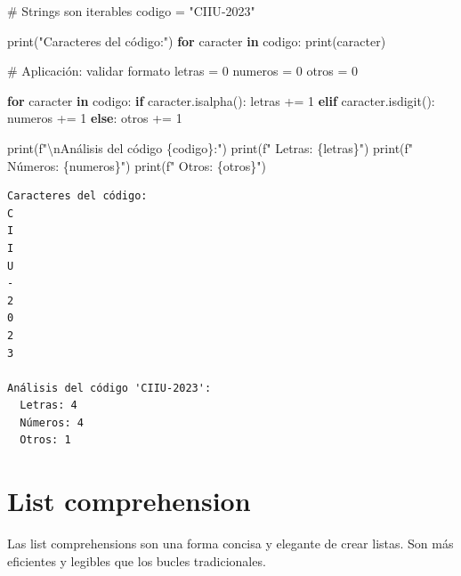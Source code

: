 \documentclass[
  doc,
  floatsintext,
  longtable,
  a4paper,
  nolmodern,
  notxfonts,
  notimes,
  12pt,
  colorlinks=true,linkcolor=blue,citecolor=blue,urlcolor=blue]{apa7}
\newenvironment{Shaded}{\begin{snugshade}}{\end{snugshade}}
\newcommand{\BuiltInTok}[1]{\textcolor[rgb]{0.00,0.23,0.31}{#1}}
\newcommand{\CharTok}[1]{\textcolor[rgb]{0.13,0.47,0.30}{#1}}
\newcommand{\CommentTok}[1]{\textcolor[rgb]{0.37,0.37,0.37}{#1}}
\newcommand{\ControlFlowTok}[1]{\textcolor[rgb]{0.00,0.23,0.31}{\textbf{#1}}}
\newcommand{\DecValTok}[1]{\textcolor[rgb]{0.68,0.00,0.00}{#1}}
\newcommand{\KeywordTok}[1]{\textcolor[rgb]{0.00,0.23,0.31}{\textbf{#1}}}
\newcommand{\NormalTok}[1]{\textcolor[rgb]{0.00,0.23,0.31}{#1}}
\newcommand{\OperatorTok}[1]{\textcolor[rgb]{0.37,0.37,0.37}{#1}}
\newcommand{\SpecialCharTok}[1]{\textcolor[rgb]{0.37,0.37,0.37}{#1}}
\newcommand{\SpecialStringTok}[1]{\textcolor[rgb]{0.13,0.47,0.30}{#1}}
\newcommand{\StringTok}[1]{\textcolor[rgb]{0.13,0.47,0.30}{#1}}
\begin{document}
\begin{Shaded}
\begin{Highlighting}[]
\CommentTok{\# Strings son iterables}
\NormalTok{codigo }\OperatorTok{=} \StringTok{"CIIU{-}2023"}

\BuiltInTok{print}\NormalTok{(}\StringTok{"Caracteres del código:"}\NormalTok{)}
\ControlFlowTok{for}\NormalTok{ caracter }\KeywordTok{in}\NormalTok{ codigo:}
    \BuiltInTok{print}\NormalTok{(caracter)}

\CommentTok{\# Aplicación: validar formato}
\NormalTok{letras }\OperatorTok{=} \DecValTok{0}
\NormalTok{numeros }\OperatorTok{=} \DecValTok{0}
\NormalTok{otros }\OperatorTok{=} \DecValTok{0}

\ControlFlowTok{for}\NormalTok{ caracter }\KeywordTok{in}\NormalTok{ codigo:}
    \ControlFlowTok{if}\NormalTok{ caracter.isalpha():}
\NormalTok{        letras }\OperatorTok{+=} \DecValTok{1}
    \ControlFlowTok{elif}\NormalTok{ caracter.isdigit():}
\NormalTok{        numeros }\OperatorTok{+=} \DecValTok{1}
    \ControlFlowTok{else}\NormalTok{:}
\NormalTok{        otros }\OperatorTok{+=} \DecValTok{1}

\BuiltInTok{print}\NormalTok{(}\SpecialStringTok{f"}\CharTok{\textbackslash{}n}\SpecialStringTok{Análisis del código \textquotesingle{}}\SpecialCharTok{\{}\NormalTok{codigo}\SpecialCharTok{\}}\SpecialStringTok{\textquotesingle{}:"}\NormalTok{)}
\BuiltInTok{print}\NormalTok{(}\SpecialStringTok{f"  Letras: }\SpecialCharTok{\{}\NormalTok{letras}\SpecialCharTok{\}}\SpecialStringTok{"}\NormalTok{)}
\BuiltInTok{print}\NormalTok{(}\SpecialStringTok{f"  Números: }\SpecialCharTok{\{}\NormalTok{numeros}\SpecialCharTok{\}}\SpecialStringTok{"}\NormalTok{)}
\BuiltInTok{print}\NormalTok{(}\SpecialStringTok{f"  Otros: }\SpecialCharTok{\{}\NormalTok{otros}\SpecialCharTok{\}}\SpecialStringTok{"}\NormalTok{)}
\end{Highlighting}
\end{Shaded}

\begin{verbatim}
Caracteres del código:
C
I
I
U
-
2
0
2
3

Análisis del código 'CIIU-2023':
  Letras: 4
  Números: 4
  Otros: 1
\end{verbatim}

\section{List comprehension}\label{list-comprehension}

Las list comprehensions son una forma concisa y elegante de crear
listas. Son más eficientes y legibles que los bucles tradicionales.
\end{document}
